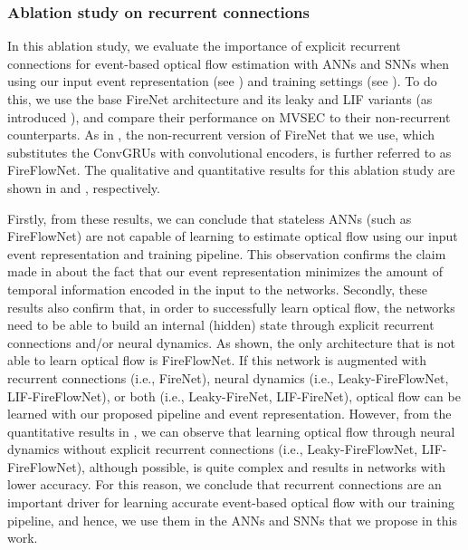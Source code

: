 \subsubsection*{Ablation study on recurrent connections}\label{app:neurips_recurrency}

In this ablation study, we evaluate the importance of explicit recurrent connections for event-based optical flow estimation with ANNs and SNNs when using our input event representation (see ) and training settings (see ). To do this, we use the base FireNet architecture and its leaky and LIF variants (as introduced ), and compare their performance on MVSEC \cite{zhu2018multivehicle} to their non-recurrent counterparts. As in \cite{paredes-valles2021back}, the non-recurrent version of FireNet that we use, which substitutes the ConvGRUs with convolutional encoders, is further referred to as FireFlowNet. The qualitative and quantitative results for this ablation study are shown in  and , respectively.

Firstly, from these results, we can conclude that stateless ANNs (such as FireFlowNet) are not capable of learning to estimate optical flow using our input event representation and training pipeline. This observation confirms the claim made in  about the fact that our event representation minimizes the amount of temporal information encoded in the input to the networks. Secondly, these results also confirm that, in order to successfully learn optical flow, the networks need to be able to build an internal (hidden) state through explicit recurrent connections and/or neural dynamics. As shown, the only architecture that is not able to learn optical flow is FireFlowNet. If this network is augmented with recurrent connections (i.e., FireNet), neural dynamics (i.e., Leaky-FireFlowNet, LIF-FireFlowNet), or both (i.e., Leaky-FireNet, LIF-FireNet), optical flow can be learned with our proposed pipeline and event representation. However, from the quantitative results in , we can observe that learning optical flow through neural dynamics without explicit recurrent connections (i.e., Leaky-FireFlowNet, LIF-FireFlowNet), although possible, is quite complex and results in networks with lower accuracy. For this reason, we conclude that recurrent connections are an important driver for learning accurate event-based optical flow with our training pipeline, and hence, we use them in the ANNs and SNNs that we propose in this work.


